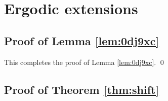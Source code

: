 \documentclass[12pt,oneside,pb-diagram]{article}
\begin{document}
\section{Ergodic extensions} \label{sec:app:ext}
\subsection{Proof of Lemma \ref{lem:0dj9xc}} \label{sec:proof:0dj9xc}



This completes the proof of Lemma \ref{lem:0dj9xc}. \qed
\subsection{Proof of Theorem \ref{thm:shift}} \label{sec:proof:shift}
\end{document}
